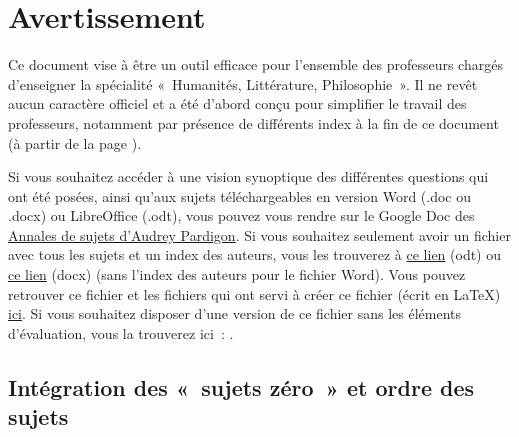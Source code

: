\fancyhead{} %
\fancyhead[LE]{\rightmark}
\fancyfoot{} %
\fancyfoot[RO]{\textbf{\thepage} \hspace*{1.5cm}}
\fancyfoot[LE]{\hspace*{1.5cm}\textbf{\thepage}}
\renewcommand{\headrulewidth}{0.4pt}
\renewcommand{\footrulewidth}{0pt}

{\let\clearpage\relax%
\noindent\chapter{Avertissement}
}
\label{avertissement}

Ce document vise à être un outil efficace pour l'ensemble des professeurs chargés d'enseigner
la spécialité «~Humanités, Littérature, Philosophie~». Il ne revêt aucun caractère officiel
et a été d'abord conçu pour simplifier le travail des professeurs, notamment par présence de différents index à la fin de ce document (à partir de la page \pageref{indexdeb}).

Si vous souhaitez accéder à une vision synoptique des différentes questions qui ont été posées, ainsi qu'aux sujets téléchargeables en version Word (.doc ou .docx) ou LibreOffice (.odt), vous pouvez vous rendre sur le Google Doc des \href{https://docs.google.com/document/d/1594BtSBMpnk_i"Lpqf7vzIPnFkFG6ZFvygOAMzdtbPhA/edit?usp=sharing}{Annales de sujets d'Audrey Pardigon}. Si vous souhaitez seulement avoir un fichier avec tous les sujets et un index des auteurs, vous les trouverez à \href{https://drive.google.com/file/d/1DnEUzL6_MTiRfS60gFycgNy-jxfQFMsu/view?usp=sharing}{ce lien} (odt) ou \href{https://docs.google.com/document/d/1XnJ397bNF5Vn-ZwEVjEvbJiCvbMBvRGi/edit?usp=sharing&ouid=103662385121242831300&rtpof=true&sd=true}{ce lien} (docx) (sans l'index des auteurs pour le fichier Word). Vous pouvez retrouver ce fichier et les fichiers qui ont servi à créer ce fichier (écrit en \LaTeX{}) \href{https://drive.google.com/drive/folders/1QwtvLY3i87WzyajRLPe0Xmmb31FK9oDp?usp=sharing}{ici}. Si vous souhaitez disposer d'une version de ce fichier sans les éléments d'évaluation, vous la trouverez ici~: \sujetshlpsanscorr{}.

\section*{Intégration des «~sujets zéro~» et ordre des sujets}

